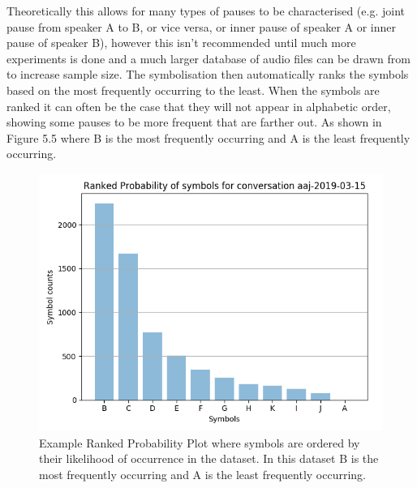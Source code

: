 Theoretically this allows for many types of pauses to be characterised (e.g. joint pause from speaker A to B, or vice versa, or inner pause of speaker A or inner pause of speaker B), however this isn't recommended until much more experiments is done and a much larger database of audio files can be drawn from to increase sample size. The symbolisation then automatically ranks the symbols based on the most frequently occurring to the least. When the symbols are ranked it can often be the case that they will not appear in alphabetic order, showing some pauses to be more frequent that are farther out. As shown in Figure 5.5 where B is the most frequently occurring and A is the least frequently occurring. \\



\begin{figure}[htbp]
	\begin{center}
		\includegraphics[scale=0.7]{src/main-matter/methodology/code-base/output/ranked_probability}
		\caption{Example Ranked Probability Plot where symbols are ordered by their likelihood of occurrence in the dataset. In this dataset B is the most frequently occurring and A is the least frequently occurring.}
		\label{default}
	\end{center}
\end{figure}

